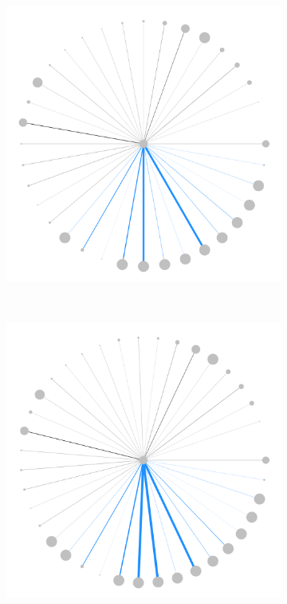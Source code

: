 \documentclass[varwidth, border=0pt]{standalone}
\begin{document}
\begin{figure}
\begin{subfigure}{0.24\linewidth}
		\vspace*{3pt}
	\end{subfigure}~%
	\begin{subfigure}{0.24\linewidth}
		\centering
		\includegraphics[width=\linewidth]{../../graphics/evolution/responsibility-us-dodd-frank-2016.pdf}%
		\vspace*{3pt}
	\end{subfigure}~%
	\begin{subfigure}{0.24\linewidth}
		\includegraphics[width=\linewidth]{../../graphics/evolution/responsibility-us-dodd-frank-2019.pdf}%

\end{subfigure}
\end{figure}
\end{document}
